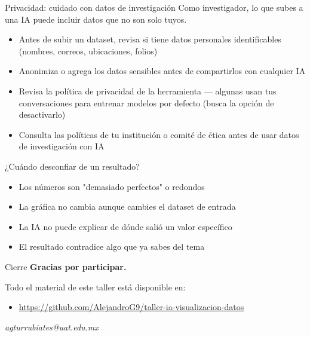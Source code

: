 \documentclass[light,minted=false]{cuzbeamer} %
\begin{document}
    \begin{frame}{Privacidad: cuidado con datos de investigación}
        Como investigador, lo que subes a una IA puede incluir datos que no
        son solo tuyos.
        \begin{itemize}
            \item Antes de subir un dataset, revisa si tiene datos personales identificables (nombres, correos, ubicaciones, folios)
            \item Anonimiza o agrega los datos sensibles antes de compartirlos con cualquier IA
            \item Revisa la política de privacidad de la herramienta — algunas usan tus conversaciones para entrenar modelos por defecto (busca la opción de desactivarlo)
            \item Consulta las políticas de tu institución o comité de ética antes de usar datos de investigación con IA
        \end{itemize}
    \end{frame}

    \begin{frame}{¿Cuándo desconfiar de un resultado?}
        \begin{itemize}
            \item Los números son "demasiado perfectos" o redondos
            \item La gráfica no cambia aunque cambies el dataset de entrada
            \item La IA no puede explicar de dónde salió un valor específico
            \item El resultado contradice algo que ya sabes del tema
        \end{itemize}
    \end{frame}

    \begin{frame}{Cierre}
        \textbf{Gracias por participar.}

        \vspace{1em}
        Todo el material de este taller está disponible en:
        \begin{itemize}
            \item \url{https://github.com/AlejandroG9/taller-ia-visualizacion-datos}
        \end{itemize}

        \vspace{1em}
        \textit{agturrubiates@uat.edu.mx}
    \end{frame}
\end{document}
